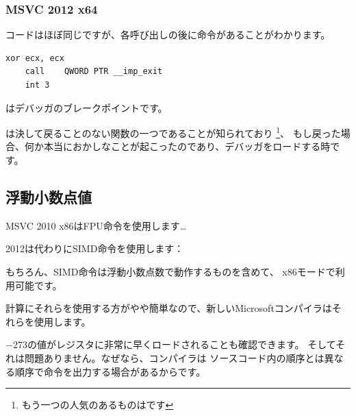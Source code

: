 \subsubsection{\Optimizing MSVC 2012 x64}

コードはほぼ同じですが、各呼び出しの後に命令があることがわかります。

\begin{lstlisting}[style=customasmx86]
	xor	ecx, ecx
	call	QWORD PTR __imp_exit
	int	3
\end{lstlisting}

はデバッガのブレークポイントです。

は決して戻ることのない関数の一つであることが知られており
\footnote{もう一つの人気のあるものはです}、
もし戻った場合、何か本当におかしなことが起こったのであり、デバッガをロードする時です。

\subsection{浮動小数点値}



MSVC 2010 x86は\ac{FPU}命令を使用します\dots



 2012は代わりに\ac{SIMD}命令を使用します：



もちろん、\ac{SIMD}命令は浮動小数点数で動作するものを含めて、
x86モードで利用可能です。

計算にそれらを使用する方がやや簡単なので、新しいMicrosoftコンパイラはそれらを使用します。

$-273$の値がレジスタに非常に早くロードされることも確認できます。
そしてそれは問題ありません。なぜなら、コンパイラは
ソースコード内の順序とは異なる順序で命令を出力する場合があるからです。